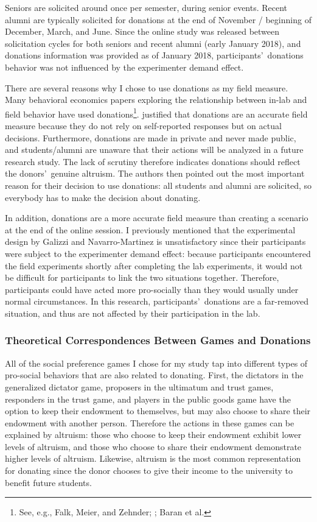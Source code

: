\documentclass[12pt]{article}
\begin{document}
Seniors are solicited around once per semester, during senior events. Recent alumni are typically solicited for donations at the end of November / beginning of December, March, and June. Since the online study was released between solicitation cycles for both seniors and recent alumni (early January 2018), and donations information was provided as of January 2018, participants\rq \ donations behavior was not influenced by the experimenter demand effect. 

There are several reasons why I chose to use donations as my field measure. Many behavioral economics papers exploring the relationship between in-lab and field behavior have used donations\footnote{See, e.g., Falk, Meier, and Zehnder; \cite{benz_meier_2006}; Baran et al.}. \cite{falk_2013} justified that donations are an accurate field measure because they do not rely on self-reported responses but on actual decisions. Furthermore, donations are made in private and never made public, and students/alumni are unaware that their actions will be analyzed in a future research study. The lack of scrutiny therefore indicates donations should reflect the donors\rq \ genuine altruism. The authors then pointed out the most important reason for their decision to use donations: all students and alumni are solicited, so everybody has to make the decision about donating.

In addition, donations are a more accurate field measure than creating a scenario at the end of the online session. I previously mentioned that the experimental design by Galizzi and Navarro-Martinez is unsatisfactory since their participants were subject to the experimenter demand effect: because participants encountered the field experiments shortly after completing the lab experiments, it would not be difficult for participants to link the two situations together. Therefore, participants could have acted more pro-socially than they would usually under normal circumstances. In this research, participants\rq \ donations are a far-removed situation, and thus are not affected by their participation in the lab.

\subsubsection{Theoretical Correspondences Between Games and Donations}

All of the social preference games I chose for my study tap into different types of pro-social behaviors that are also related to donating. First, the dictators in the generalized dictator game, proposers in the ultimatum and trust games, responders in the trust game, and players in the public goods game have the option to keep their endowment to themselves, but may also choose to share their endowment with another person. Therefore the actions in these games can be explained by altruism: those who choose to keep their endowment exhibit lower levels of altruism, and those who choose to share their endowment demonstrate higher levels of altruism. Likewise, altruism is the most common representation for donating since the donor chooses to give their income to the university to benefit future students. 
\end{document}
